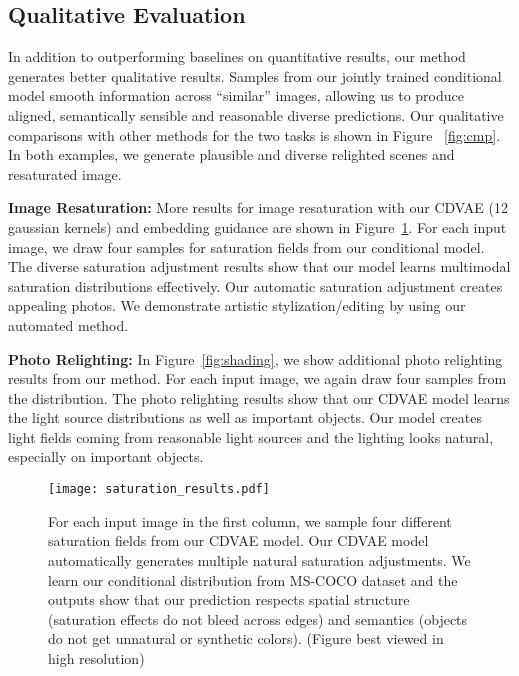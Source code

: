 \documentclass[10pt,twocolumn,letterpaper]{article}
\begin{document}




\subsection{Qualitative Evaluation}
\label{sec:qual} 

In addition to outperforming baselines on quantitative results, our method generates better
qualitative results. Samples from our jointly trained conditional model smooth information
across ``similar'' images, allowing us to produce aligned, semantically sensible and 
reasonable diverse predictions.  Our qualitative comparisons with other methods for the two tasks 
is shown in Figure ~\ref{fig:cmp}.  In both examples, we generate plausible and diverse relighted 
scenes and resaturated image. 

\textbf{Image Resaturation:} More results for image resaturation with our CDVAE (12 gaussian
kernels) and embedding guidance are shown in Figure~\ref{fig:saturation}. For each input image, we draw four 
samples for saturation fields from our conditional model. The diverse saturation adjustment results show 
that our model learns multimodal saturation distributions effectively. Our automatic saturation 
adjustment creates appealing photos. We demonstrate artistic stylization/editing by using our 
automated method. 


\textbf{Photo Relighting:}  In Figure~\ref{fig:shading}, we show additional photo relighting 
results from our method. For each input image, we again draw four samples from the distribution. The 
photo relighting results show that our CDVAE model learns the light source distributions as well 
as important objects. Our model creates light fields coming from reasonable light sources and 
the lighting looks natural, especially on important objects. 

\begin{figure}[!t]
\centerline{  \texttt{[image: saturation\_results.pdf]}}
  \caption{For each input image in the first column, we sample four different saturation fields from our CDVAE model. 
  Our CDVAE model automatically generates multiple natural saturation adjustments. We learn our conditional distribution from 
   MS-COCO dataset and the outputs show that our prediction respects spatial structure (saturation effects do not bleed 
   across edges) and semantics (objects do not get unnatural or synthetic colors). (Figure best viewed in high resolution)}
  \label{fig:saturation}
\end{figure}
\end{document}
